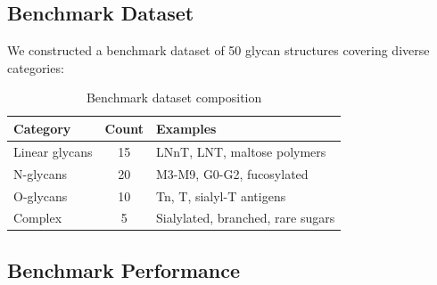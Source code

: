 \documentclass[11pt,a4paper]{article}
\begin{document}
\subsection{Benchmark Dataset}

We constructed a benchmark dataset of 50 glycan structures covering diverse categories:

\begin{table}[h]
\centering
\begin{tabular}{lcl}
\toprule
Category & Count & Examples \\
\midrule
Linear glycans & 15 & LNnT, LNT, maltose polymers \\
N-glycans & 20 & M3-M9, G0-G2, fucosylated \\
O-glycans & 10 & Tn, T, sialyl-T antigens \\
Complex & 5 & Sialylated, branched, rare sugars \\
\bottomrule
\end{tabular}
\caption{Benchmark dataset composition}
\end{table}

\subsection{Benchmark Performance}
\end{document}
